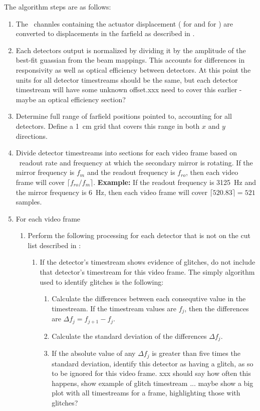 The algorithm steps are as follows:
\begin{enumerate}
\item The  \MCE\ channles containing the actuator displacement ( for  and  for ) are converted to displacements in the farfield as described in .
\item Each detectors output is normalized by dividing it by the amplitude of the best-fit guassian from the beam mappings. This accounts for differences in responsivity as well as optical efficiency between detectors. At this point the units for all detector timestreams should be the same, but each detector timestream will have some unknown offset.xxx need to cover this earlier - maybe an optical efficiency section?
\item Determine full range of farfield positions pointed to, accounting for all detectors. Define a \SI{1}{\cm} grid that covers this range in both $x$ and $y$ directions.
\item Divide detector timestreams into sections for each video frame based on \MCE\ readout rate and frequency at which the secondary mirror is rotating.
  If the mirror frequency is $f_m$ and the readout frequency is $f_{ro}$, then each video frame will cover $\lceil f_{ro} / f_{m} \rceil$.
  \textbf{Example:} If the readout frequency is \SI{3125}{\Hz} and the mirror frequency is \SI{6}{\Hz}, then each video frame will cover $\lceil 520.83 \rceil = 521$ samples.
\item For each video frame
  \begin{enumerate}
  \item Perform the following processing for each detector that is not on the cut list described in :
    \begin{enumerate}
    \item If the detector's timestream shows evidence of glitches, do not include that detector's timestream for this video frame. The simply algorithm used to identify glitches is the following:
      \begin{enumerate}
      \item Calculate the differences between each consequtive value in the timestream.
        If the timestream values are $f_j$, then the differences are $\Delta f_j = f_{j+1} - f_j$.
      \item Calculate the standard deviation of the differences $\Delta f_j$.
      \item If the absolute value of any $\Delta f_j$ is greater than five times the standard deviation, identify this detector as having a glitch, as so to be ignored for this video frame. xxx should say how often this happens, show example of glitch timestream ... maybe show a big plot with all timestreams for a frame, highlighting those with glitches?

\end{enumerate}
\end{enumerate}
\end{enumerate}
\end{enumerate}
